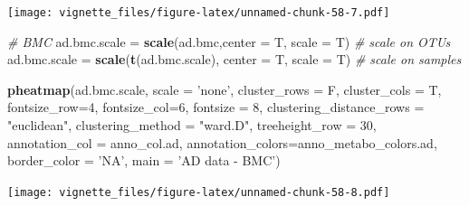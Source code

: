 \documentclass[]{book}
\newenvironment{Shaded}{\begin{snugshade}}{\end{snugshade}}
\newcommand{\KeywordTok}[1]{\textcolor[rgb]{0.13,0.29,0.53}{\textbf{#1}}}
\newcommand{\DataTypeTok}[1]{\textcolor[rgb]{0.13,0.29,0.53}{#1}}
\newcommand{\DecValTok}[1]{\textcolor[rgb]{0.00,0.00,0.81}{#1}}
\newcommand{\StringTok}[1]{\textcolor[rgb]{0.31,0.60,0.02}{#1}}
\newcommand{\CommentTok}[1]{\textcolor[rgb]{0.56,0.35,0.01}{\textit{#1}}}
\newcommand{\NormalTok}[1]{#1}
\begin{document}
\texttt{[image: vignette\_files/figure-latex/unnamed-chunk-58-7.pdf]}

\begin{Shaded}
\begin{Highlighting}[]
\CommentTok{# BMC}
\NormalTok{ad.bmc.scale =}\StringTok{ }\KeywordTok{scale}\NormalTok{(ad.bmc,}\DataTypeTok{center =}\NormalTok{ T, }\DataTypeTok{scale =}\NormalTok{ T) }\CommentTok{# scale on OTUs}
\NormalTok{ad.bmc.scale =}\StringTok{ }\KeywordTok{scale}\NormalTok{(}\KeywordTok{t}\NormalTok{(ad.bmc.scale), }\DataTypeTok{center =}\NormalTok{ T, }\DataTypeTok{scale =}\NormalTok{ T) }\CommentTok{# scale on samples}

\KeywordTok{pheatmap}\NormalTok{(ad.bmc.scale, }
         \DataTypeTok{scale =} \StringTok{'none'}\NormalTok{, }
         \DataTypeTok{cluster_rows =}\NormalTok{ F, }
         \DataTypeTok{cluster_cols =}\NormalTok{ T, }
         \DataTypeTok{fontsize_row=}\DecValTok{4}\NormalTok{, }\DataTypeTok{fontsize_col=}\DecValTok{6}\NormalTok{,}
         \DataTypeTok{fontsize =} \DecValTok{8}\NormalTok{,}
         \DataTypeTok{clustering_distance_rows =} \StringTok{"euclidean"}\NormalTok{,}
         \DataTypeTok{clustering_method =} \StringTok{"ward.D"}\NormalTok{,}
         \DataTypeTok{treeheight_row =} \DecValTok{30}\NormalTok{,}
         \DataTypeTok{annotation_col =}\NormalTok{ anno_col.ad,}
         \DataTypeTok{annotation_colors=}\NormalTok{anno_metabo_colors.ad,}
         \DataTypeTok{border_color =} \StringTok{'NA'}\NormalTok{,}
         \DataTypeTok{main =} \StringTok{'AD data - BMC'}\NormalTok{)}
\end{Highlighting}
\end{Shaded}

\texttt{[image: vignette\_files/figure-latex/unnamed-chunk-58-8.pdf]}
\end{document}
